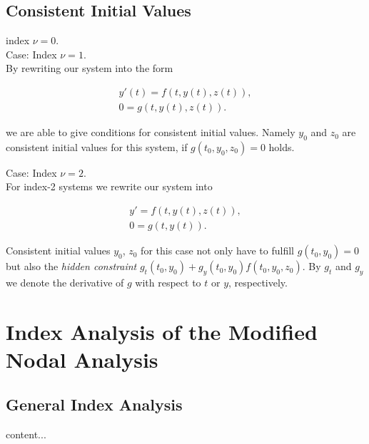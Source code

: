 	\subsection{Consistent Initial Values}
	\begin{frame}
		index $\nu = 0$.\\ 
		
		Case: Index $\nu = 1$.\\
		
			By rewriting our system into the form
			
			\begin{align*}
				y'(t) = f(t,y(t),z(t)), \\
				0 = g(t,y(t),z(t)).
			\end{align*}
			
			we are able to give conditions for consistent initial values. Namely $y_0$ and $z_0$ are consistent initial values for this system, if $g(t_0, y_0, z_0) = 0$ holds.
			
	\end{frame}

	\begin{frame}
		Case: Index $\nu = 2$.\\
		
		For index-2 systems we rewrite our system into
		
		\begin{align*}
			y' = f(t,y(t),z(t)), \\
			0 = g(t,y(t)).
		\end{align*}
		
		Consistent initial values $y_0$, $z_0$ for this case not only have to fulfill $g(t_0, y_0) = 0$ but also the \emph{hidden constraint} $g_t(t_0, y_0) + g_y(t_0, y_0)f(t_0, y_0, z_0)$. By $g_t$ and $g_y$ we denote the derivative of $g$ with respect to $t$ or $y$, respectively.
	\end{frame}

\section{Index Analysis of the Modified Nodal Analysis}
	\subsection{General Index Analysis}
	\begin{frame}
		content...
	\end{frame}
